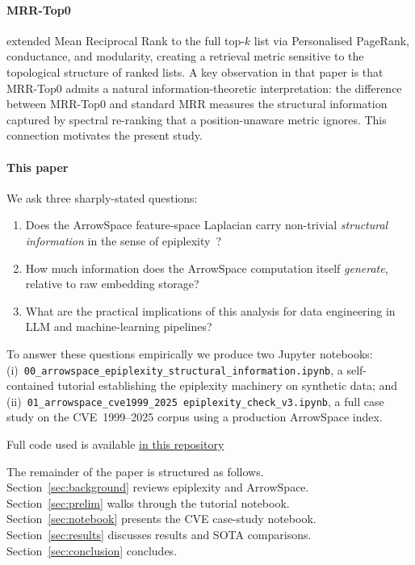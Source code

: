 \documentclass[12pt,a4paper]{article}
\theoremstyle{plain}
\theoremstyle{definition}
\theoremstyle{remark}
\newcommand{\1}{\mathbf{1}}
\begin{document}
	\paragraph{MRR-Top0}
	\cite{mrrtop02025} extended Mean Reciprocal Rank to the full top-$k$
	list via Personalised PageRank, conductance, and modularity, creating a
	retrieval metric sensitive to the topological structure of ranked lists.
	A key observation in that paper is that MRR-Top0 admits a natural
	information-theoretic interpretation: the difference between
	MRR-Top0 and standard MRR measures the structural information captured
	by spectral re-ranking that a position-unaware metric ignores.
	This connection motivates the present study.
	
	\paragraph{This paper}
	We ask three sharply-stated questions:
	\begin{enumerate}
		\item Does the ArrowSpace feature-space Laplacian carry
		non-trivial \emph{structural information} in the sense of
		epiplexity~\citep{finzi2026epiplexity}?
		\item How much information does the ArrowSpace computation itself
		\emph{generate}, relative to raw embedding storage?
		\item What are the practical implications of this analysis for data
		engineering in LLM and machine-learning pipelines?
	\end{enumerate}
	To answer these questions empirically we produce two Jupyter notebooks:\\
	(i)~\texttt{00\_arrowspace\_epiplexity\_structural\_information.ipynb},
	a self-contained tutorial establishing the epiplexity machinery on
	synthetic data; and\\ (ii)~\texttt{01\_arrowspace\_cve1999\_2025\-%
		epiplexity\_check\_v3.ipynb}, a full case study on the CVE~1999--2025
	corpus using a production ArrowSpace index.
	
	Full code used is available \href{https://github.com/tuned-org-uk/graph-wiring-epiplexity}{in this repository}
	
	The remainder of the paper is structured as follows.\\
	Section~\ref{sec:background} reviews epiplexity and ArrowSpace.\\
	Section~\ref{sec:prelim} walks through the tutorial notebook.\\
	Section~\ref{sec:notebook} presents the CVE case-study notebook.\\
	Section~\ref{sec:results} discusses results and SOTA comparisons.\\
	Section~\ref{sec:conclusion} concludes.
	
\end{document}

